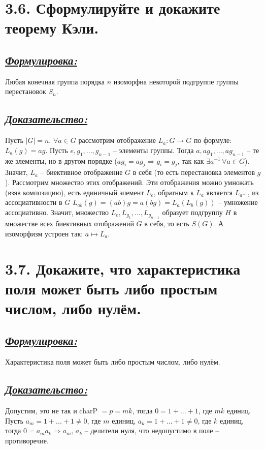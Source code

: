 \documentclass{article}
\begin{document}
\section*{\LARGE 3.6. Сформулируйте и докажите теорему Кэли. }
\subsection*{\Large \underline{\textit{Формулировка: }}}
Любая конечная группа порядка $n$ изоморфна некоторой подгруппе группы перестановок $S_n$.

\subsection*{\Large \underline{\textit{Доказательство: }}}
Пусть $|G| = n$. $\forall a \in G$ рассмотрим отображение $L_a : G \rightarrow G$ по формуле: $L_a(g) = ag$.
\newline Пусть $e, g_1, ..., g_{n-1}$ -- элементы группы. Тогда $a, ag_1, ..., ag_{n - 1}$ -- те же элементы, но в другом порядке ($ag_i = ag_j \Rightarrow g_i = g_j$, так как $\exists a^{-1}\,\forall a \in G$). Значит, $L_a$ -- биективное отображение $G$ в себя (то есть перестановка элементов $g$). Рассмотрим множество этих отображений. Эти отображения можно умножать (взяв композицию), есть единичный элемент $L_e$, обратным к $L_a$ является $L_{a^{-1}}$, из ассоциативности в $G$ $L_{ab}(g) = (ab)g = a(bg) = L_a(L_b(g))$ -- умножение ассоциативно. Значит, множество $L_e, L_{g_1}, ..., L_{g_{n-1}}$ образует подгруппу $H$ в множестве всех биективных отображений $G$ в себя, то есть $S(G)$. А изоморфизм устроен так: $a \mapsto L_a$.

\section*{\LARGE 3.7. Докажите, что характеристика поля может быть либо простым числом, либо нулём. }
\subsection*{\Large \underline{\textit{Формулировка: }}}
Характеристика поля может быть либо простым числом, либо нулём.

\subsection*{\Large \underline{\textit{Доказательство: }}}
Допустим, это не так и charP $ = p = m k$, тогда $0 = 1 + ... + 1$, где $mk$ единиц. Пусть $a_m = 1 + ... + 1 \ne 0$, где $m$ единиц, $a_k = 1 + ... + 1 \ne 0$, где $k$ единиц, тогда $0 = a_m a_k \Rightarrow a_m,\, a_k$ -- делители нуля, что недопустимо в поле -- противоречие.
\end{document}
